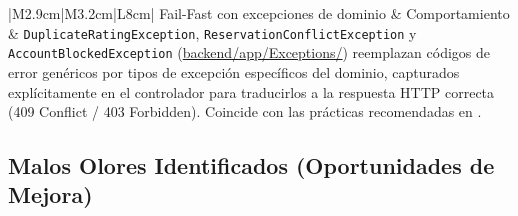 {\begin{longtable}{|M{2.9cm}|M{3.2cm}|L{8cm}|}
Fail-Fast con excepciones de dominio & Comportamiento &
\texttt{DuplicateRatingException}, \texttt{ReservationConflictException} y \texttt{AccountBlockedException} (\url{backend/app/Exceptions/}) reemplazan códigos de error genéricos por tipos de excepción específicos del dominio, capturados explícitamente en el controlador para traducirlos a la respuesta HTTP correcta (409 Conflict / 403 Forbidden). Coincide con las prácticas recomendadas en \cite{ref17,ref19,ref20}. \\ \hline
\end{longtable}
}

\subsection{Malos Olores Identificados (Oportunidades de Mejora)}
\label{sssec:malos-olores}
